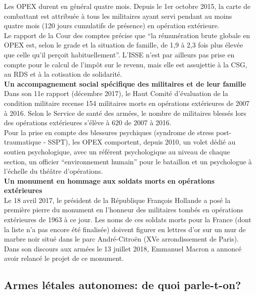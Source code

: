 \documentclass[8pt]{article}
\begin{document}
Les OPEX durent en général quatre mois. Depuis le 1er octobre 2015, la carte de combattant est attribuée à tous les militaires ayant servi pendant au moins quatre mois (120 jours cumulatifs de présence) en opération extérieure.\\

Le rapport de la Cour des comptes précise que “la rémunération brute globale en OPEX est, selon le grade et la situation de famille, de 1,9 à 2,3 fois plus élevée que celle qu’il perçoit habituellement”. L’ISSE n’est par ailleurs pas prise en compte pour le calcul de l’impôt sur le revenu, mais elle est assujettie à la CSG, au RDS et à la cotisation de solidarité.\\

\textbf{Un accompagnement social spécifique des militaires et de leur famille}\\

Dans son 11e rapport (décembre 2017), le Haut Comité d’évaluation de la condition militaire recense 154 militaires morts en opérations extérieures de 2007 à 2016. Selon le Service de santé des armées, le nombre de militaires blessés lors des opérations extérieures s’élève à 620 de 2007 à 2016.\\

Pour la prise en compte des blessures psychiques (syndrome de stress post-traumatique - SSPT), les OPEX comportent, depuis 2010, un volet dédié au soutien psychologique, avec un référent psychologique au niveau de chaque section, un officier “environnement humain” pour le bataillon et un psychologue à l’échelle du théâtre d’opérations.\\

\textbf{Un monument en hommage aux soldats morts en opérations extérieures}\\

Le 18 avril 2017, le président de la République François Hollande a posé la première pierre du monument en l’honneur des militaires tombés en opérations extérieures de 1963 à ce jour. Les noms de ces soldats morts pour la France (dont la liste n’a pas encore été finalisée) doivent figurer en lettres d’or sur un mur de marbre noir situé dans le parc André-Citroën (XVe arrondissement de Paris). Dans son discours aux armées le 13 juillet 2018, Emmanuel Macron a annoncé avoir relancé le projet de ce monument.




\newpage

\subsection{Armes létales autonomes: de quoi parle-t-on?}
\label{sec:autonome}
\end{document}
